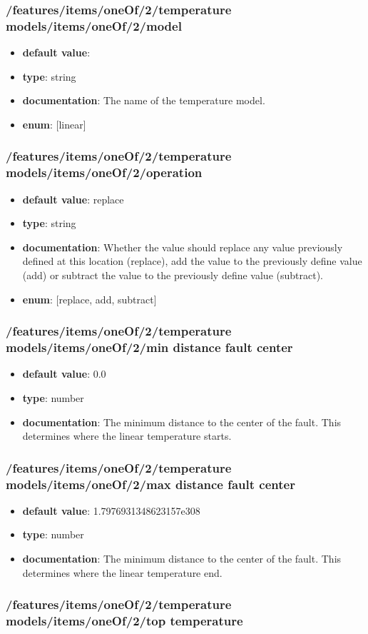 \subsubsection{/features/items/oneOf/2/temperature models/items/oneOf/2/model}
\begin{itemize}\item {\bf default value}: 
\item {\bf type}: string
\item {\bf documentation}: The name of the temperature model.
\item {\bf enum}: [linear]\end{itemize}\subsubsection{/features/items/oneOf/2/temperature models/items/oneOf/2/operation}
\begin{itemize}\item {\bf default value}: replace
\item {\bf type}: string
\item {\bf documentation}: Whether the value should replace any value previously defined at this location (replace), add the value to the previously define value (add) or subtract the value to the previously define value (subtract).
\item {\bf enum}: [replace, add, subtract]\end{itemize}\subsubsection{/features/items/oneOf/2/temperature models/items/oneOf/2/min distance fault center}
\begin{itemize}\item {\bf default value}: 0.0
\item {\bf type}: number
\item {\bf documentation}: The minimum distance to the center of the fault. This determines where the linear temperature starts.
\end{itemize}\subsubsection{/features/items/oneOf/2/temperature models/items/oneOf/2/max distance fault center}
\begin{itemize}\item {\bf default value}: 1.7976931348623157e308
\item {\bf type}: number
\item {\bf documentation}: The minimum distance to the center of the fault. This determines where the linear temperature end.
\end{itemize}\subsubsection{/features/items/oneOf/2/temperature models/items/oneOf/2/top temperature}
